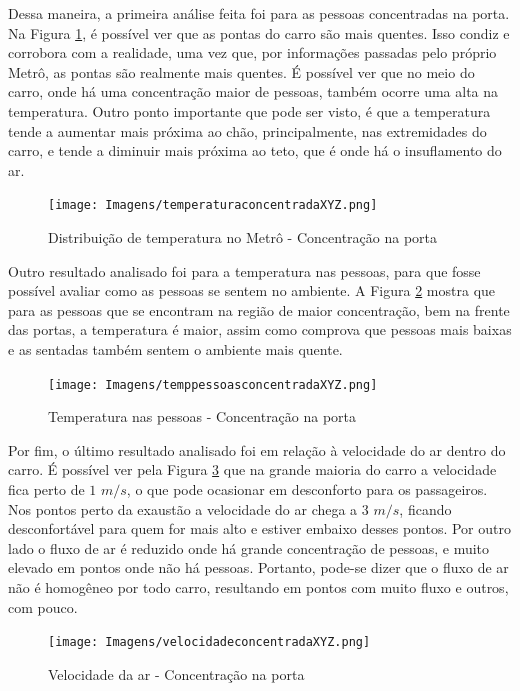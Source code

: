 \documentclass[acronym,symbols,table]{fei}
\begin{document}
Dessa maneira, a primeira análise feita foi para as pessoas concentradas na porta. Na Figura \ref{fig:temperaturaconcentradaXYZ}, é possível ver que as pontas do carro são mais quentes. Isso condiz e corrobora com a realidade, uma vez que, por informações passadas pelo próprio Metrô, as pontas são realmente mais quentes. É possível ver que no meio do carro, onde há uma concentração maior de pessoas, também ocorre uma alta na temperatura. Outro ponto importante que pode ser visto, é que a temperatura tende a aumentar mais próxima ao chão, principalmente, nas extremidades do carro, e tende a diminuir mais próxima ao teto, que é onde há o insuflamento do ar.

\begin{figure}[!htb]
    \centering
    \caption{Distribuição de temperatura no Metrô - Concentração na porta}
    \texttt{[image: Imagens/temperaturaconcentradaXYZ.png]}
    \label{fig:temperaturaconcentradaXYZ}
\end{figure}

Outro resultado analisado foi para a temperatura nas pessoas, para que fosse possível avaliar como as pessoas se sentem no ambiente. A Figura \ref{fig:temppessoasconcentradaXYZ} mostra que para as pessoas que se encontram na região de maior concentração, bem na frente das portas, a temperatura é maior, assim como comprova que pessoas mais baixas e as sentadas também sentem o ambiente mais quente.

\begin{figure}[!htb]
    \centering
    \caption{Temperatura nas pessoas - Concentração na porta}
    \texttt{[image: Imagens/temppessoasconcentradaXYZ.png]}
    \label{fig:temppessoasconcentradaXYZ}
\end{figure}
\newpage
Por fim, o último resultado analisado foi em relação à velocidade do ar dentro do carro. É possível ver pela Figura \ref{fig:velocidadeconcentradaXYZ} que na grande maioria do carro a velocidade fica perto de $1$ $m/s$, o que pode ocasionar em desconforto para os passageiros. Nos pontos perto da exaustão a velocidade do ar chega a $3$ $m/s$, ficando desconfortável para quem for mais alto e estiver embaixo desses pontos. Por outro lado o fluxo de ar é reduzido onde há grande concentração de pessoas, e muito elevado em pontos onde não há pessoas. Portanto, pode-se dizer que o fluxo de ar não é homogêneo por todo carro, resultando em pontos com muito fluxo e outros, com pouco. 

\begin{figure}[!htb]
    \centering
    \caption{Velocidade da ar - Concentração na porta}
    \texttt{[image: Imagens/velocidadeconcentradaXYZ.png]}
    \label{fig:velocidadeconcentradaXYZ}
\end{figure}
\end{document}
